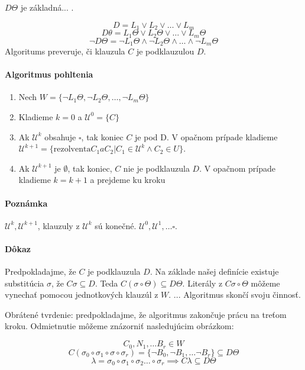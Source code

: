 $D\Theta$ je základná... .

$$D = L_1 \lor L_2 \lor \ldots \lor L_m$$
$$D \theta = L_1\Theta \lor L_2 \Theta \lor \ldots \lor L_m \Theta$$
$$\neg D\Theta = \neg L_1 \Theta \land \neg L_2 \Theta \land \ldots \land \neg
L_m \Theta$$
Algoritums preveruje, či klauzula $C$ je podklauzulou $D$.

\paragraph{Algoritmus  pohltenia}
\begin{enumerate}
	\item Nech $W = \{ \neg L_1 \Theta, \neg L_2 \Theta, \ldots, \neg L_m
	\Theta \}$

	\item Kladieme $k=0$ a $\mathcal{U}^0 = \{ C \}$
	\item Ak $\mathcal{U}^k$ obsahuje $\square$, tak koniec $C$ je pod D. V
	opačnom prípade kladieme $\mathcal{U}^{k+1} = \{ \mbox{rezolventa} C_1 a
	C_2 | C_1 \in \mathcal{U}^{k} \land C_2 \in U\}$. 
	\item Ak $\mathcal{U}^{k+1}$ je $\emptyset$, tak koniec, $C$ nie je
	podklauzula $D$. V opačnom prípade kladieme $k=k+1$ a prejdeme ku kroku

\end{enumerate}

\paragraph{Poznámka} $\mathcal{U}^k, \mathcal{U}^{k+1}$, klauzuly z
$\mathcal{U}^{k}$ sú konečné. $\mathcal{U}^0, \mathcal{U}^1, \ldots \square$.

\paragraph{Dôkaz} Predpokladajme, že $C$ je podklauzula $D$. Na základe našej
definície existuje substitúcia $\sigma$, že $C\sigma \subseteq D$. Teda
$C(\sigma \circ \Theta) \subseteq D\Theta$. Literály z $C\sigma \circ \Theta$
môžeme vynechať pomocou jednotkových klauzúl z $W$. ... Algoritmus skončí svoju
činnosť.
\par
Obrátené tvrdenie: predpokladajme, že algoritmus zakončuje prácu na treťom
kroku. Odmietnutie môžeme znázorniť nasledujúcim obrázkom:


$$C_0, N_1 ,\ldots B_r \in W$$
$$C(\sigma_0 \circ \sigma_1 \circ \sigma \circ \sigma_r) = \{ \neg B_0, \neg
B_1, \ldots \neg B_r\} \subseteq D\Theta$$
$$\lambda = \sigma_0 \circ \sigma_1 \circ \sigma_2 \ldots \circ \sigma_r \implies
C \lambda \subseteq D\Theta$$


